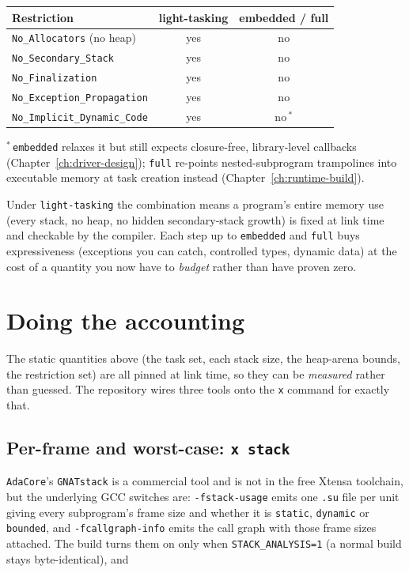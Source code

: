 \begin{center}
\begin{tabular}{l c c}
\toprule
\textbf{Restriction} & \textbf{light-tasking} & \textbf{embedded / full} \\ \midrule
\texttt{No\_Allocators} (no heap)            & yes & no \\
\texttt{No\_Secondary\_Stack}                & yes & no \\
\texttt{No\_Finalization}                    & yes & no \\
\texttt{No\_Exception\_Propagation}          & yes & no \\
\texttt{No\_Implicit\_Dynamic\_Code}         & yes & no\,$^{*}$ \\
\bottomrule
\end{tabular}
\end{center}

\noindent$^{*}$\,\texttt{embedded} relaxes it but still expects closure-free,
library-level callbacks (Chapter~\ref{ch:driver-design}); \texttt{full} re-points
nested-subprogram trampolines into executable memory at task creation instead
(Chapter~\ref{ch:runtime-build}).

Under \texttt{light-tasking} the combination means a program's entire memory use
(every stack, no heap, no hidden secondary-stack growth) is fixed at link time and
checkable by the compiler. Each step up to \texttt{embedded} and \texttt{full} buys
expressiveness (exceptions you can catch, controlled types, dynamic data) at the
cost of a quantity you now have to \emph{budget} rather than have proven zero.

\section{Doing the accounting}

The static quantities above (the task set, each stack size, the heap-arena
bounds, the restriction set) are all pinned at link time, so they can be
\emph{measured} rather than guessed. The repository wires three tools onto the
\texttt{x} command for exactly that.

\subsection{Per-frame and worst-case: \texttt{x stack}}

\texttt{AdaCore}'s \texttt{GNATstack} is a commercial tool and is not in the
free Xtensa toolchain, but the underlying GCC switches are: \texttt{-fstack-usage}
emits one \texttt{.su} file per unit giving every subprogram's frame size and
whether it is \texttt{static}, \texttt{dynamic} or \texttt{bounded}, and
\texttt{-fcallgraph-info} emits the call graph with those frame sizes attached.
The build turns them on only when \texttt{STACK\_ANALYSIS=1} (a normal build stays
byte-identical), and

